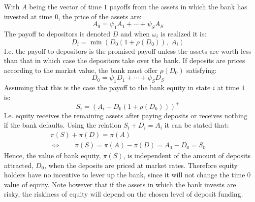 \documentclass[10pt,a4paper]{article}
\begin{document}
        With $A$ being the vector of time $1$ payoffs from the assets in which the bank has invested at time $0$, the price of the assets are:
            \begin{equation}
                A_{0} = \psi_{1}A_{1} + \cdots + \psi_{S}A_{S}
            \end{equation}
        The payoff to depositors is denoted $D$ and when $\omega_{i}$ is realized it is:
            \begin{equation}
                D_{i} = \min\left(D_{0}(1+\rho(D_{0})),\; A_{i}\right)
            \end{equation}
        I.e. the payoff to depositors is the promised payoff unless the assets are worth less than that in which case the depositors take over the bank. If deposits are prices according to the market value, the bank must offer $\rho(D_{0})$ satisfying:
            \begin{equation}
                D_{0} = \psi_{1}D_{1} + \cdots + \psi_{S}D_{S}
            \end{equation}
        Assuming that this is the case the payoff to the bank equity in state $i$ at time $1$ is:
            \begin{equation}
                S_{i} = \left(A_{i} - D_{0}(1+\rho(D_{0}))\right)^{+}
            \end{equation}
        I.e. equity receives the remaining assets after paying deposits or receives nothing if the bank defaults. Using the relation $S_{i} + D_{i} = A_{i}$ it can be stated that:
            \begin{gather}
                \pi(S) + \pi(D) = \pi(A) \\
                \Leftrightarrow \qquad \pi(S)=\pi(A)-\pi(D) = A_{0} - D_{0} = S_{0}
            \end{gather}
        Hence, the value of bank equity, $\pi(S)$, is independent of the amount of deposits attracted, $D_{0}$, when the deposits are priced at market rates. Therefore equity holders have no incentive to lever up the bank, since it will not change the time $0$ value of equity. Note however that if the assets in which the bank invests are risky, the riskiness of equity will depend on the chosen level of deposit funding.
\end{document}
